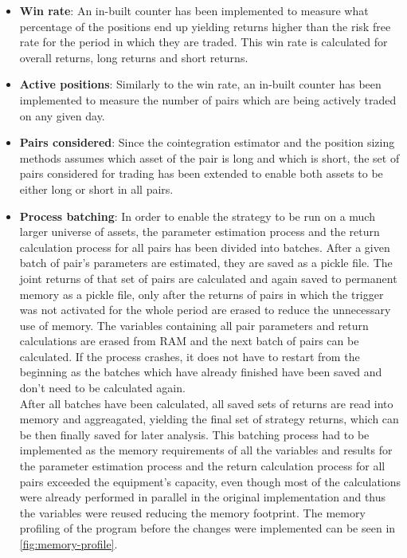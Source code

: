 \begin{itemize}
    \item \textbf{Win rate}: An in-built counter has been implemented to measure what percentage of the positions end up yielding returns higher than the risk free rate for the period in which they are traded. This win rate is calculated for overall returns, long returns and short returns. 
    \item \textbf{Active positions}: Similarly to the win rate, an in-built counter has been implemented to measure the number of pairs which are being actively traded on any given day.  
    \item \textbf{Pairs considered}: Since the cointegration estimator and the position sizing methods assumes which asset of the pair is long and which is short, the set of pairs considered for trading has been extended to enable both assets to be either long or short in all pairs. 
    \item \textbf{Process batching}: In order to enable the strategy to be run on a much larger universe of assets, the parameter estimation process and the return calculation process for all pairs has been divided into batches. After a given batch of pair's parameters are estimated, they are saved as a pickle file. The joint returns of that set of pairs are calculated and again saved to permanent memory as a pickle file, only after the returns of pairs in which the trigger was not activated for the whole period are erased to reduce the unnecessary use of memory. The variables containing all pair parameters and return calculations are erased from RAM and the next batch of pairs can be calculated. If the process crashes, it does not have to restart from the beginning as the batches which have already finished have been saved and don't need to be calculated again. 
    \\After all batches have been calculated, all saved sets of returns are read into memory and aggreagated, yielding the final set of strategy returns, which can be then finally saved for later analysis. This batching process had to be implemented as the memory requirements of all the variables and results for the parameter estimation process and the return calculation process for all pairs exceeded the equipment's capacity, even though most of the calculations were already performed in parallel in the original implementation and thus the variables were reused reducing the memory footprint. The memory profiling of the program before the changes were implemented can be seen in \autoref{fig:memory-profile}.
    \newpage
    \begin{figure}[h]

\end{figure}
\end{itemize}
